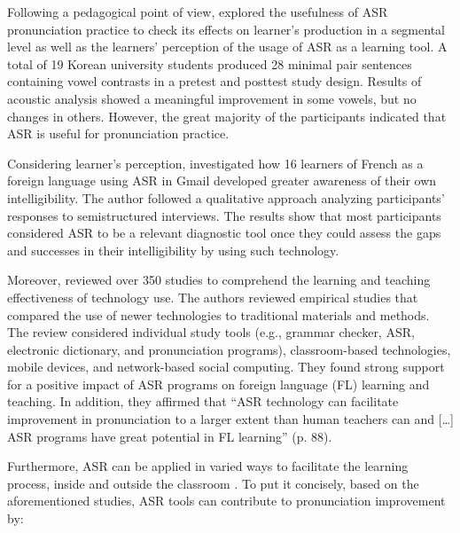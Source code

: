 \documentclass[english]{textolivre}
\begin{document}
Following a pedagogical point of view, \textcite{inceoglu2020} explored the usefulness of ASR pronunciation practice to check its effects on learner’s production in a segmental level as well as the learners’ perception of the usage of ASR as a learning tool. A total of 19 Korean university students produced 28 minimal pair sentences containing vowel contrasts in a pretest and posttest study design. Results of acoustic analysis showed a meaningful improvement in some vowels, but no changes in others. However, the great majority of the participants indicated that ASR is useful for pronunciation practice.

Considering learner’s perception, \textcite{mroz2018} investigated how 16 learners of French as a foreign language using ASR in Gmail developed greater awareness of their own intelligibility. The author followed a qualitative approach analyzing participants’ responses to semistructured interviews. The results show that most participants considered ASR to be a relevant diagnostic tool once they could assess the gaps and successes in their intelligibility by using such technology.

Moreover, \textcite{golonka2014} reviewed over 350 studies to comprehend the learning and teaching effectiveness of technology use. The authors reviewed empirical studies that compared the use of newer technologies to traditional materials and methods. The review considered individual study tools (e.g., grammar checker, ASR, electronic dictionary, and pronunciation programs), classroom-based technologies, mobile devices, and network-based social computing. They found strong support for a positive impact of ASR programs on foreign language (FL) learning and teaching. In addition, they affirmed that “ASR technology can facilitate improvement in pronunciation to a larger extent than human teachers can and […] ASR programs have great potential in FL learning” (p. 88).

Furthermore, ASR can be applied in varied ways to facilitate the learning process, inside and outside the classroom \cite{kim2006, chen2011, levis2013, golonka2014, ashwell2017, liakin2017, mroz2018, dizon2020, dizontang2020, inceoglu2020, mccrocklin2020, rogerson-revell2021}. To put it concisely, based on the aforementioned studies, ASR tools can contribute to pronunciation improvement by:
\end{document}
